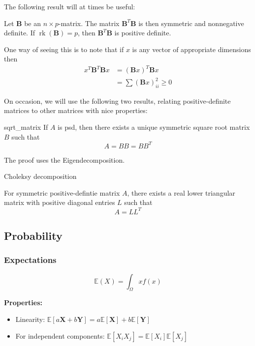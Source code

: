 \documentclass[11pt, %
	oneside, %
	english, %
	onehalfspacing, %
	]{article} %
\numberwithin{equation}{section}
\begin{document}
The following result will at times be useful:

\begin{proposition}{}{}
    Let $\mathbf{B}$ be an $n \times p$-matrix. The matrix $\mathbf{B}^{T} \mathbf{B}$ is then symmetric and nonnegative definite. If $\operatorname{rk}(\mathbf{B})=p$, then $\mathbf{B}^{T} \mathbf{B}$ is positive definite.
\end{proposition}

One way of seeing this is to note that if $x$ is any vector of appropriate dimensions then
\begin{equation*}
    \begin{aligned}
        x^T \mathbf{B}^T \mathbf{B} x &= (\mathbf{B} x)^T \mathbf{B} x \\
        &= \sum (\mathbf{B} x)_{ii}^2 \geq 0
    \end{aligned}
\end{equation*}

On occasion, we will use the following two results, relating positive-definite matrices to other matrices with nice properties:

\begin{proposition}{}{sqrt_matrix}
    If $A$ is psd, then there exists a unique symmetric square root matrix $B$ such that
    $$
    A=B B=B B^T
    $$
\end{proposition}

The proof uses the Eigendecomposition.

\begin{proposition}{Choleksy decomposition}{}

    For symmetric positive-defintie matrix  $A$, there exists a real lower triangular matrix with positive diagonal entries $L$ such that
    \begin{equation*}
        A=L L^T
    \end{equation*}
\end{proposition}



\subsection{Probability}

\subsubsection{Expectations}
$$
\mathbb{E}(X) = \int_\Omega x  f(x)
$$

\textbf{Properties:}
\begin{itemize}
	\item Linearity: $\mathbb{E}[a\mathbf{X} + b\mathbf{Y}] = a\mathbb{E}[\mathbf{X}] + b\mathbb{E}[\mathbf{Y}]$
	\item For independent components: $\mathbb{E}[X_iX_j] = \mathbb{E}[X_i]\mathbb{E}[X_j]$
\end{itemize}
\end{document}

